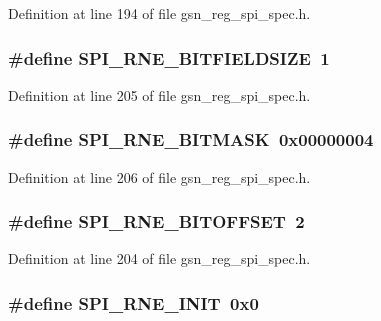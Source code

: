 Definition at line 194 of file gsn\_\-reg\_\-spi\_\-spec.h.

\hypertarget{a00573_a1359c99978c037bc2f8f1a668f90e6b5}{
\subsubsection[{SPI\_\-RNE\_\-BITFIELDSIZE}]{\setlength{\rightskip}{0pt plus 5cm}\#define SPI\_\-RNE\_\-BITFIELDSIZE~1}}
\label{a00573_a1359c99978c037bc2f8f1a668f90e6b5}


Definition at line 205 of file gsn\_\-reg\_\-spi\_\-spec.h.

\hypertarget{a00573_afc54cf4ee84eff7fe7b6e3e65a8327f0}{
\subsubsection[{SPI\_\-RNE\_\-BITMASK}]{\setlength{\rightskip}{0pt plus 5cm}\#define SPI\_\-RNE\_\-BITMASK~0x00000004}}
\label{a00573_afc54cf4ee84eff7fe7b6e3e65a8327f0}


Definition at line 206 of file gsn\_\-reg\_\-spi\_\-spec.h.

\hypertarget{a00573_a1cac7c2f55c444b806069f776d3bf15d}{
\subsubsection[{SPI\_\-RNE\_\-BITOFFSET}]{\setlength{\rightskip}{0pt plus 5cm}\#define SPI\_\-RNE\_\-BITOFFSET~2}}
\label{a00573_a1cac7c2f55c444b806069f776d3bf15d}


Definition at line 204 of file gsn\_\-reg\_\-spi\_\-spec.h.

\hypertarget{a00573_a4dc029405f808d6d4d752205920ca307}{
\subsubsection[{SPI\_\-RNE\_\-INIT}]{\setlength{\rightskip}{0pt plus 5cm}\#define SPI\_\-RNE\_\-INIT~0x0}}
\label{a00573_a4dc029405f808d6d4d752205920ca307}


